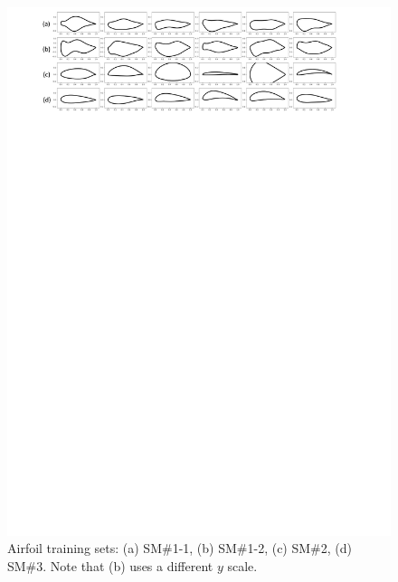 \begin{figure}[tbh]
    \begin{center}
        \includegraphics[width=1\linewidth]{chapter6/fig/SBO_airfoils.pdf}
    \end{center}
    \caption{
        \small Airfoil training sets: (a) SM\#1-1, (b) SM\#1-2, (c) SM\#2, (d) SM\#3. Note that (b) uses a different $y$ scale.
    }
    \label{ch6:fig:main_SBO_airfoils}
\end{figure}

